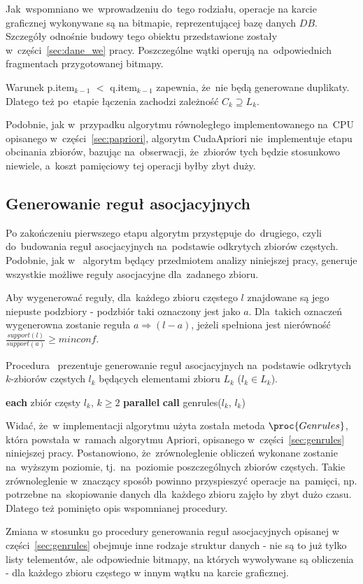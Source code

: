 Jak~wspomniano we~wprowadzeniu do~tego rodziału, operacje na karcie graficznej wykonywane są na bitmapie, reprezentującej bazę danych $DB$. Szczegóły odnośnie budowy tego obiektu przedstawione zostały w~części~\ref{sec:dane_we} pracy. Poszczególne wątki operują na~odpowiednich fragmentach przygotowanej bitmapy.

Warunek p.item$_{k-1}$ $<$ q.item$_{k-1}$ zapewnia, że~nie będą generowane duplikaty. Dlatego też po~etapie łączenia zachodzi zależność $C_k \supseteq L_k$.

Podobnie, jak w~przypadku algorytmu równoległego implementowanego na~CPU opisanego w~części~\ref{sec:papriori}, algorytm CudaApriori nie~implementuje etapu obcinania zbiorów, bazując na~obserwacji, że~zbiorów tych będzie stosunkowo niewiele, a~koszt pamięciowy tej operacji byłby zbyt duży. 

\subsection{Generowanie reguł asocjacyjnych}
Po zakończeniu pierwszego etapu algorytm przystępuje do~drugiego, czyli do~budowania reguł asocjacyjnych na~podstawie odkrytych zbiorów częstych. Podobnie, jak w~\cite{Apriori:Main} algorytm będący przedmiotem analizy niniejszej pracy, generuje wszystkie możliwe reguły asocjacyjne dla~zadanego zbioru.

Aby wygenerować reguły, dla~każdego zbioru częstego $l$ znajdowane są jego niepuste podzbiory - podzbiór taki oznaczony jest jako $a$. Dla~takich oznaczeń wygenerowna zostanie reguła $a \Rightarrow (l-a)$, jeżeli spełniona jest nierówność $\frac{support(l)}{support(a)} \geq minconf$.

Procedura~ prezentuje generowanie reguł asocjacyjnych na~podstawie odkrytych $k$-zbiorów częstych $l_k$ będących elementami zbioru $L_k$ ($l_k \in L_k$).

\begin{codebox}
		\li \For \textbf{each} zbiór częsty $l_k$, $k \geq 2$ \textbf{parallel}
		\li \Do
			\textbf{call} genrules($l_k$, $l_k$)
			\End
		\End
\end{codebox}

Widać, że~w implementacji algorytmu użyta została metoda $\proc{Genrules}$, która powstała w~ramach algorytmu Apriori, opisanego w~części~\ref{sec:genrules} niniejszej pracy. Postanowiono, że~zrównoleglenie obliczeń wykonane zostanie na~wyższym poziomie, tj.~na~poziomie poszczególnych zbiorów częstych. Takie zrównoleglenie w~znaczący sposób powinno przyspieszyć operacje na~pamięci, np. potrzebne na~skopiowanie danych dla~każdego zbioru zajęło by zbyt dużo czasu. Dlatego też pominięto opis wspomnianej procedury.

Zmiana w stosunku go procedury generowania reguł asocjacyjnych opisanej w części~\ref{sec:genrules} obejmuje inne rodzaje struktur danych - nie są to już tylko listy telementów, ale odpowiednie bitmapy, na których wywoływane są obliczenia - dla każdego zbioru częstego w innym wątku na karcie graficznej.